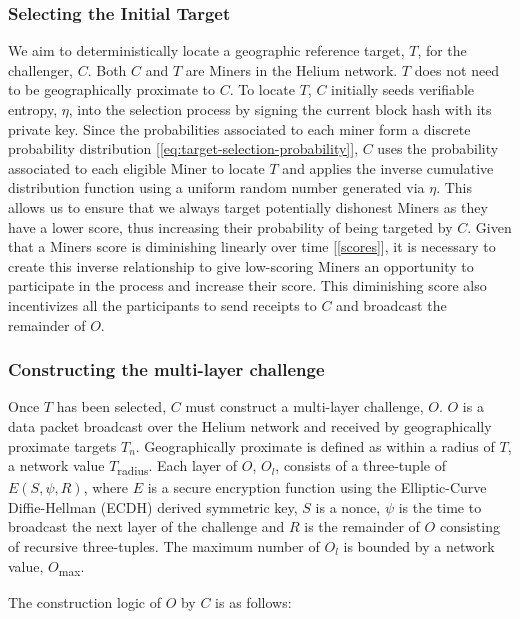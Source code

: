 \documentclass[10pt, nonatbib, nocopyrightspace, reprint]{sigplanconf}
\newcommand{\secref}[1]{[\autoref{#1}]}
\renewcommand{\eqref}[1]{[\autoref{#1}]}
\begin{document}
\subsubsection{Selecting the Initial Target}

We aim to deterministically locate a geographic reference target, $T$, for the challenger, $C$. Both $C$ and $T$ are Miners in the Helium network. $T$ does not need to be geographically proximate to $C$. To locate $T$, $C$ initially seeds verifiable entropy, $\eta$, into the selection process by signing the current block hash with its private key. Since the probabilities associated to each miner form a discrete probability distribution \eqref{eq:target-selection-probability}, $C$ uses the probability associated to each eligible Miner to locate $T$ and applies the inverse cumulative distribution function using a uniform random number generated via $\eta$. This allows us to ensure that we always target potentially dishonest Miners as they have a lower score, thus increasing their probability of being targeted by $C$. Given that a Miners score is diminishing linearly over time \secref{scores}, it is necessary to create this inverse relationship to give low-scoring Miners an opportunity to participate in the process and increase their score. This diminishing score also incentivizes all the participants to send receipts to $C$ and broadcast the remainder of $O$.

\subsubsection{Constructing the multi-layer challenge}

Once $T$ has been selected, $C$ must construct a multi-layer challenge, $O$. $O$ is a data packet broadcast over the Helium network and received by geographically proximate targets $T_n$. Geographically proximate is defined as within a radius of $T$, a network value $T$\textsubscript{radius}. Each layer of $O$, $O_l$, consists of a three-tuple of $E\left(S, \psi, R\right)$, where $E$ is a secure encryption function using the Elliptic-Curve Diffie-Hellman (ECDH) derived symmetric key, $S$ is a nonce, $\psi$ is the time to broadcast the next layer of the challenge and $R$ is the remainder of $O$ consisting of recursive three-tuples. The maximum number of $O_l$ is bounded by a network value, $O$\textsubscript{max}.

The construction logic of $O$ by $C$ is as follows:
\end{document}
